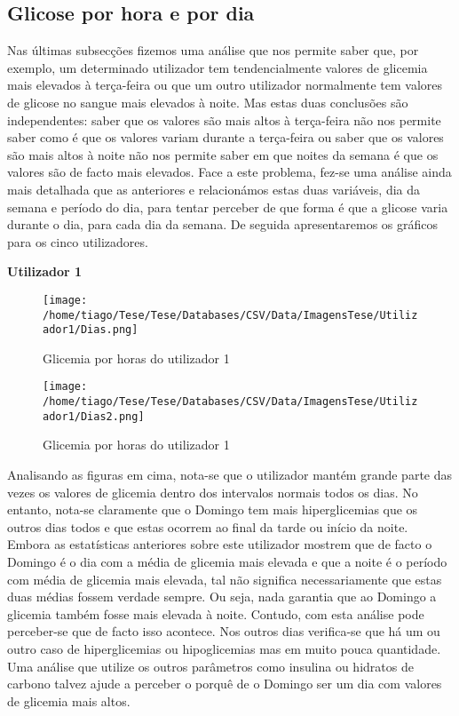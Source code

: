 \subsection{Glicose por hora e por dia}

Nas últimas subsecções fizemos uma análise que nos permite saber que, por exemplo, um determinado utilizador tem tendencialmente valores de glicemia mais elevados à terça-feira ou que um outro utilizador normalmente tem valores de glicose no sangue mais elevados à noite. Mas estas duas conclusões são independentes: saber que os valores são mais altos à terça-feira não nos permite saber como é que os valores variam durante a terça-feira ou saber que os valores são mais altos à noite não nos permite saber em que noites da semana é que os valores são de facto mais elevados. Face a este problema, fez-se uma análise ainda mais detalhada que as anteriores e relacionámos estas duas variáveis, dia da semana e período do dia, para tentar perceber de que forma é que a glicose varia durante o dia, para cada dia da semana. De seguida apresentaremos os gráficos para os cinco utilizadores. 

\textbf{Utilizador 1}

\begin{figure}[H]
\centering
\texttt{[image: /home/tiago/Tese/Tese/Databases/CSV/Data/ImagensTese/Utilizador1/Dias.png]}
\caption{Glicemia por horas do utilizador 1}
\end{figure}

\begin{figure}[H]
\centering
\texttt{[image: /home/tiago/Tese/Tese/Databases/CSV/Data/ImagensTese/Utilizador1/Dias2.png]}
\caption{Glicemia por horas do utilizador 1}
\end{figure}

Analisando as figuras em cima, nota-se que o utilizador mantém grande parte das vezes os valores de glicemia dentro dos intervalos normais todos os dias. No entanto, nota-se claramente que o Domingo tem mais hiperglicemias que os outros dias todos e que estas ocorrem ao final da tarde ou início da noite. Embora as estatísticas anteriores sobre este utilizador mostrem que de facto o Domingo é o dia com a média de glicemia mais elevada e que a noite é o período com média de glicemia mais elevada, tal não significa necessariamente que estas duas médias fossem verdade sempre. Ou seja, nada garantia que ao Domingo a glicemia também fosse mais elevada à noite. Contudo, com esta análise pode perceber-se que de facto isso acontece. Nos outros dias verifica-se que há um ou outro caso de hiperglicemias ou hipoglicemias mas em muito pouca quantidade. Uma análise que utilize os outros parâmetros como insulina ou hidratos de carbono talvez ajude a perceber o porquê de o Domingo ser um dia com valores de glicemia mais altos. 

